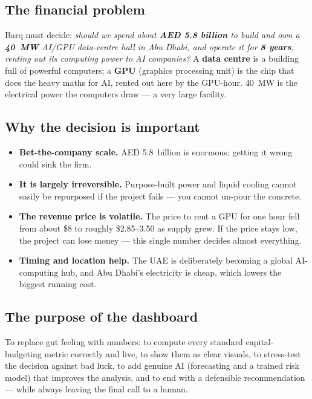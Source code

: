 \documentclass[11pt,a4paper]{article}
\newcommand{\term}[1]{\textcolor{tvblue}{\textbf{#1}}}
\begin{document}
\subsection{The financial problem}
Barq must decide: \emph{should we spend about \textbf{AED 5.8 billion} to build and own a
\textbf{40~MW} AI/GPU data-centre hall in Abu Dhabi, and operate it for \textbf{8 years}, renting out
its computing power to AI companies?} A \term{data centre} is a building full of powerful computers;
a \term{GPU} (graphics processing unit) is the chip that does the heavy maths for AI, rented out here
by the GPU-hour. 40~MW is the electrical power the computers draw --- a very large facility.

\subsection{Why the decision is important}
\begin{itemize}
  \item \textbf{Bet-the-company scale.} AED 5.8~billion is enormous; getting it wrong could sink
  the firm.
  \item \textbf{It is largely irreversible.} Purpose-built power and liquid cooling cannot easily be
  repurposed if the project fails --- you cannot un-pour the concrete.
  \item \textbf{The revenue price is volatile.} The price to rent a GPU for one hour fell from about
  \$8 to roughly \$2.85--3.50 as supply grew. If the price stays low, the project can lose money ---
  this single number decides almost everything.
  \item \textbf{Timing and location help.} The UAE is deliberately becoming a global AI-computing hub,
  and Abu Dhabi's electricity is cheap, which lowers the biggest running cost.
\end{itemize}

\subsection{The purpose of the dashboard}
To replace gut feeling with numbers: to compute every standard capital-budgeting metric correctly and
live, to show them as clear visuals, to stress-test the decision against bad luck, to add genuine AI
(forecasting and a trained risk model) that improves the analysis, and to end with a defensible
recommendation --- while always leaving the final call to a human.

\end{document}

